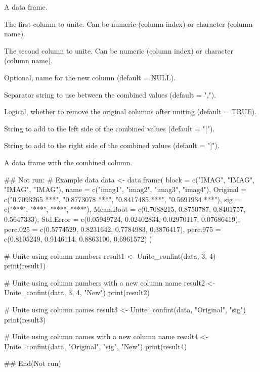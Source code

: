 \documentclass[a4paper]{book}
\begin{document}
\begin{Arguments}
\begin{ldescription}
\item[\code{data}] A data frame.

\item[\code{col1}] The first column to unite. Can be numeric (column index) or character (column name).

\item[\code{col2}] The second column to unite. Can be numeric (column index) or character (column name).

\item[\code{Col}] Optional, name for the new column (default = NULL).

\item[\code{sep}] Separator string to use between the combined values (default = ",").

\item[\code{remove}] Logical, whether to remove the original columns after uniting (default = TRUE).

\item[\code{left}] String to add to the left side of the combined values (default = "[").

\item[\code{right}] String to add to the right side of the combined values (default = "]").
\end{ldescription}
\end{Arguments}
%
\begin{Value}
A data frame with the combined column.
\end{Value}
%
\begin{Examples}
\begin{ExampleCode}
\#\# Not run: 
# Example data
data <- data.frame(
  block = c("IMAG", "IMAG", "IMAG", "IMAG"),
  name = c("imag1", "imag2", "imag3", "imag4"),
  Original = c("0.7093265 ***", "0.8773078 ***", "0.8417485 ***", "0.5691934 ***"),
  sig = c("***", "***", "***", "***"),
  Mean.Boot = c(0.7088215, 0.8750787, 0.8401757, 0.5647333),
  Std.Error = c(0.05949724, 0.02402834, 0.02970117, 0.07686419),
  perc.025 = c(0.5774529, 0.8231642, 0.7784983, 0.3876417),
  perc.975 = c(0.8105249, 0.9146114, 0.8863100, 0.6961572)
)

# Unite using column numbers
result1 <- Unite_confint(data, 3, 4)
print(result1)

# Unite using column numbers with a new column name
result2 <- Unite_confint(data, 3, 4, "New")
print(result2)

# Unite using column names
result3 <- Unite_confint(data, "Original", "sig")
print(result3)

# Unite using column names with a new column name
result4 <- Unite_confint(data, "Original", "sig", "New")
print(result4)

## End(Not run)
\end{ExampleCode}
\end{Examples}
\end{document}
